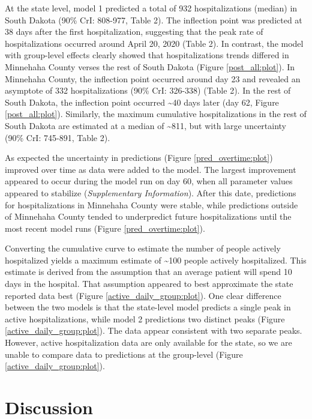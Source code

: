 \documentclass[
]{article}
\begin{document}
At the state level, model 1 predicted a total of 932 hospitalizations (median) in South Dakota (90\% CrI: 808-977, Table 2). The inflection point was predicted at 38 days after the first hospitalization, suggesting that the peak rate of hospitalizations occurred around April 20, 2020 (Table 2). In contrast, the model with group-level effects clearly showed that hospitalizations trends differed in Minnehaha County verses the rest of South Dakota (Figure \ref{post_all:plot}). In Minnehaha County, the inflection point occurred around day 23 and revealed an asymptote of 332 hospitalizations (90\% CrI: 326-338) (Table 2). In the rest of South Dakota, the inflection point occurred \textasciitilde40 days later (day 62, Figure \ref{post_all:plot}). Similarly, the maximum cumulative hospitalizations in the rest of South Dakota are estimated at a median of \textasciitilde811, but with large uncertainty (90\% CrI: 745-891, Table 2).

As expected the uncertainty in predictions (Figure \ref{pred_overtime:plot}) improved over time as data were added to the model. The largest improvement appeared to occur during the model run on day 60, when all parameter values appeared to stabilize (\emph{Supplementary Information}). After this date, predictions for hospitalizations in Minnehaha County were stable, while predictions outside of Minnehaha County tended to underpredict future hospitalizations until the most recent model runs (Figure \ref{pred_overtime:plot}).

Converting the cumulative curve to estimate the number of people actively hospitalized yields a maximum estimate of \textasciitilde100 people actively hospitalized. This estimate is derived from the assumption that an average patient will spend 10 days in the hospital. That assumption appeared to best approximate the state reported data best (Figure \ref{active_daily_group:plot}). One clear difference between the two models is that the state-level model predicts a single peak in active hospitalizations, while model 2 predictions two distinct peaks (Figure \ref{active_daily_group:plot}). The data appear consistent with two separate peaks. However, active hospitalization data are only available for the state, so we are unable to compare data to predictions at the group-level (Figure \ref{active_daily_group:plot}).

\hypertarget{discussion}{%
\section{Discussion}\label{discussion}}
\end{document}
